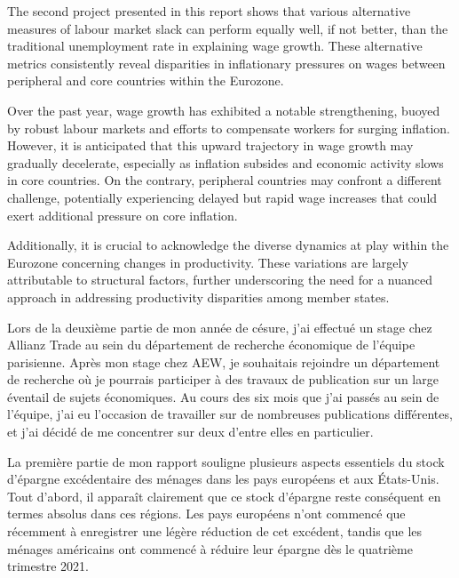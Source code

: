 The second project presented in this report shows that various alternative measures of labour market slack can perform equally well, if not better, than the traditional unemployment rate in explaining wage growth. 
These alternative metrics consistently reveal disparities in inflationary pressures on wages between peripheral and core countries within the Eurozone.

Over the past year, wage growth has exhibited a notable strengthening, buoyed by robust labour markets and efforts to compensate workers for surging inflation. 
However, it is anticipated that this upward trajectory in wage growth may gradually decelerate, especially as inflation subsides and economic activity slows in core countries. 
On the contrary, peripheral countries may confront a different challenge, potentially experiencing delayed but rapid wage increases that could exert additional pressure on core inflation.

Additionally, it is crucial to acknowledge the diverse dynamics at play within the Eurozone concerning changes in productivity. 
These variations are largely attributable to structural factors, further underscoring the need for a nuanced approach in addressing productivity disparities among member states.

\begin{center}
    \HRule
\end{center}

Lors de la deuxième partie de mon année de césure, j'ai effectué un stage chez Allianz Trade au sein du département de recherche économique de l'équipe parisienne. 
Après mon stage chez AEW, je souhaitais rejoindre un département de recherche où je pourrais participer à des travaux de publication sur un large éventail de sujets économiques. 
Au cours des six mois que j'ai passés au sein de l'équipe, j'ai eu l'occasion de travailler sur de nombreuses publications différentes, et j'ai décidé de me concentrer sur deux d'entre elles en particulier.

La première partie de mon rapport souligne plusieurs aspects essentiels du stock d'épargne excédentaire des ménages dans les pays européens et aux États-Unis. 
Tout d'abord, il apparaît clairement que ce stock d'épargne reste conséquent en termes absolus dans ces régions. 
Les pays européens n'ont commencé que récemment à enregistrer une légère réduction de cet excédent, tandis que les ménages américains ont commencé à réduire leur épargne dès le quatrième trimestre 2021.

